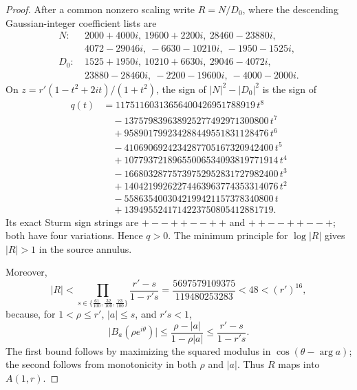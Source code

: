 \begin{proof}
After a common nonzero scaling write \(R=N/D_0\), where the descending Gaussian-integer coefficient lists are
\begin{align*}
N:&\ 2000+4000i,\ 19600+2200i,\ 28460-23880i,\\ &\ 4072-29046i,\ -6630-10210i,\ -1950-1525i,\\
D_0:&\ 1525+1950i,\ 10210+6630i,\ 29046-4072i,\\ &\ 23880-28460i,\ -2200-19600i,\ -4000-2000i.
\end{align*}
On \(z=r'(1-t^2+2it)/(1+t^2)\), the sign of \(|N|^2-|D_0|^2\) is the sign of
\begin{align*}
q(t)&=11751160313656400426951788919\,t^{8}\\
&\quad-137579839638925277492971300800\,t^{7}\\
&\quad+958901799234288449551831128476\,t^{6}\\
&\quad-4106906924234287705167320942400\,t^{5}\\
&\quad+10779372189655006534093819771914\,t^{4}\\
&\quad-16680328775739752952831727982400\,t^{3}\\
&\quad+14042199262274463963774353314076\,t^{2}\\
&\quad-5586354003042199421157378340800\,t\\
&\quad+1394955241714223750805412881719 .
\end{align*}
Its exact Sturm sign strings are \({+}{-}{-}{+}{+}{-}{-}{+}{+}\) and \({+}{+}{-}{-}{+}{+}{-}{-}{+}\); both have four variations. Hence \(q>0\). The minimum principle for \(\log|R|\) gives \(|R|>1\) in the source annulus.

Moreover,
\[
|R|<\prod_{s\in\{\frac{61}{100},\frac{32}{100},\frac{73}{100}\}}\frac{r'-s}{1-r's}=\frac{5697579109375}{119480253283}<48<(r')^{16},
\]
because, for \(1<\rho\le r'\), \(|a|\le s\), and \(r's<1\),
\[
\bigl|B_a(\rho e^{i\theta})\bigr|\le\frac{\rho-|a|}{1-\rho|a|}\le\frac{r'-s}{1-r's}.
\]
The first bound follows by maximizing the squared modulus in \(\cos(\theta-\arg a)\); the second follows from monotonicity in both \(\rho\) and \(|a|\). Thus \(R\) maps into \(A(1,r)\).


\end{proof}
